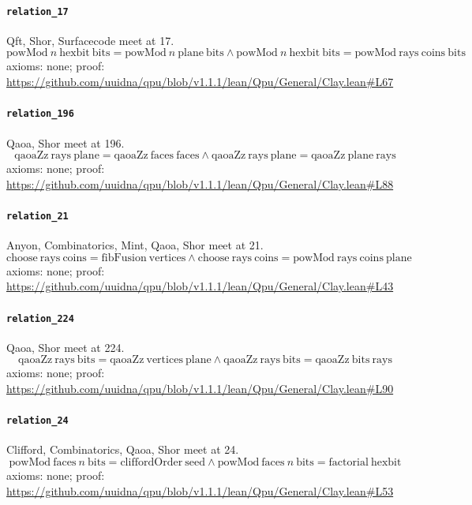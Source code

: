 \documentclass[11pt]{article}
\begin{document}
\paragraph{\texttt{relation\_17}}
Qft, Shor, Surfacecode meet at 17.
\[ \mathrm{powMod}\ n\ \mathrm{hexbit}\ \mathrm{bits} = \mathrm{powMod}\ n\ \mathrm{plane}\ \mathrm{bits} \land \mathrm{powMod}\ n\ \mathrm{hexbit}\ \mathrm{bits} = \mathrm{powMod}\ \mathrm{rays}\ \mathrm{coins}\ \mathrm{bits} \]
\noindent axioms: none; proof: \url{https://github.com/uuidna/qpu/blob/v1.1.1/lean/Qpu/General/Clay.lean\#L67}

\paragraph{\texttt{relation\_196}}
Qaoa, Shor meet at 196.
\[ \mathrm{qaoaZz}\ \mathrm{rays}\ \mathrm{plane} = \mathrm{qaoaZz}\ \mathrm{faces}\ \mathrm{faces} \land \mathrm{qaoaZz}\ \mathrm{rays}\ \mathrm{plane} = \mathrm{qaoaZz}\ \mathrm{plane}\ \mathrm{rays} \]
\noindent axioms: none; proof: \url{https://github.com/uuidna/qpu/blob/v1.1.1/lean/Qpu/General/Clay.lean\#L88}

\paragraph{\texttt{relation\_21}}
Anyon, Combinatorics, Mint, Qaoa, Shor meet at 21.
\[ \mathrm{choose}\ \mathrm{rays}\ \mathrm{coins} = \mathrm{fibFusion}\ \mathrm{vertices} \land \mathrm{choose}\ \mathrm{rays}\ \mathrm{coins} = \mathrm{powMod}\ \mathrm{rays}\ \mathrm{coins}\ \mathrm{plane} \]
\noindent axioms: none; proof: \url{https://github.com/uuidna/qpu/blob/v1.1.1/lean/Qpu/General/Clay.lean\#L43}

\paragraph{\texttt{relation\_224}}
Qaoa, Shor meet at 224.
\[ \mathrm{qaoaZz}\ \mathrm{rays}\ \mathrm{bits} = \mathrm{qaoaZz}\ \mathrm{vertices}\ \mathrm{plane} \land \mathrm{qaoaZz}\ \mathrm{rays}\ \mathrm{bits} = \mathrm{qaoaZz}\ \mathrm{bits}\ \mathrm{rays} \]
\noindent axioms: none; proof: \url{https://github.com/uuidna/qpu/blob/v1.1.1/lean/Qpu/General/Clay.lean\#L90}

\paragraph{\texttt{relation\_24}}
Clifford, Combinatorics, Qaoa, Shor meet at 24.
\[ \mathrm{powMod}\ \mathrm{faces}\ n\ \mathrm{bits} = \mathrm{cliffordOrder}\ \mathrm{seed} \land \mathrm{powMod}\ \mathrm{faces}\ n\ \mathrm{bits} = \mathrm{factorial}\ \mathrm{hexbit} \]
\noindent axioms: none; proof: \url{https://github.com/uuidna/qpu/blob/v1.1.1/lean/Qpu/General/Clay.lean\#L53}
\end{document}
